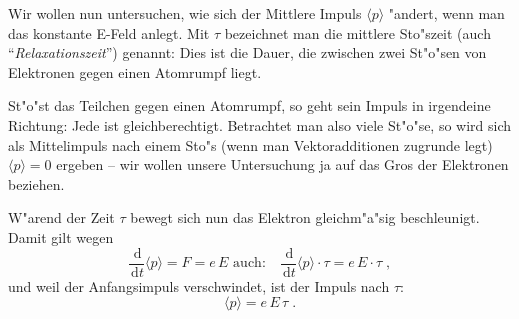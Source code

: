 \documentclass[twoside,a4paper]{book}
\newcommand{\diff}{\ensuremath{\, \mathrm{d}}}
\begin{document}
Wir wollen nun untersuchen, wie sich der Mittlere Impuls $\langle p
\rangle$ "andert, wenn man das konstante E-Feld anlegt.
Mit $\tau$ bezeichnet man die mittlere Sto"szeit (auch
"`\emph{Relaxationszeit}"') genannt: Dies ist die Dauer, die zwischen
zwei St"o"sen von Elektronen gegen einen Atomrumpf liegt. 

St"o"st das Teilchen gegen einen Atomrumpf, so geht sein Impuls in
irgendeine Richtung: Jede ist gleichberechtigt. Betrachtet man also
viele St"o"se, so wird sich als Mittelimpuls nach einem Sto"s (wenn
man Vektoradditionen zugrunde legt) $\langle p  \rangle = 0$ ergeben
-- wir wollen unsere Untersuchung ja auf das Gros der Elektronen
beziehen.

W"arend der Zeit $\tau$ bewegt sich nun das Elektron gleichm"a"sig
beschleunigt. Damit gilt wegen
\begin{equation*}
   \frac{\diff }{\diff t}\langle p  \rangle = F = e \, E 
\text{ auch: ~ }
\frac{\diff }{\diff t}\langle p \rangle \cdot \tau =  e\, E \cdot \tau \;,
\end{equation*}
und weil der Anfangsimpuls verschwindet, ist der Impuls nach $\tau$:
\begin{equation}
   \label{eqn_drude_p}
   \langle p \rangle = e\, E\, \tau \;.
\end{equation}




\end{document}

